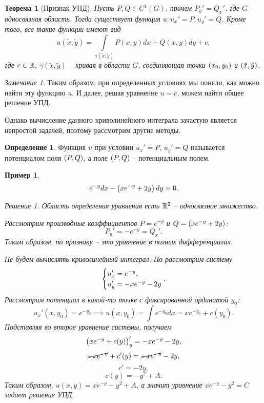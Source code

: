 \documentclass[a5paper, 10pt]{article}
\theoremstyle{definition}
\newtheorem{Def}{Определение}
\theoremstyle{plain}
\newtheorem{Th}{Теорема}
\newtheorem{Ex}{Пример}
\theoremstyle{remark}
\newtheorem*{Note}{Замечание}
\newtheorem*{Solution}{Решение}
\begin{document}
	\begin{Th}[Признак УПД]
		Пусть $P, Q \in C^1(G)$, причем $P_y' = Q_x'$, где $G$ -- односвязная область.
		Тогда существует функция $u : u_x' = P, u_y' = Q$. Кроме того, все такие функции имеют вид 
		\[
		u(\tilde{x}, \tilde{y}) = \int\limits_{\gamma(\tilde{x}, \tilde{y})} P(x,y)dx + Q(x,y)dy + c,
		\]
		где $c \in \mathbb{R}$, $\gamma(\tilde{x}, \tilde{y})$ -- кривая в области $G$, соединяющая точки $\left(x_0,y_0\right)$ и $\left(\tilde{x}, \tilde{y}\right)$.
	\end{Th}
	
	\begin{Note}
		Таким образом, при определенных условиях мы поняли, как можно найти эту функцию $u$. И далее, решая уравнение $u=c$, можем найти общее решение УПД.
		
		Однако вычисление данного криволинейного интеграла зачастую является непростой задачей, поэтому рассмотрим другие методы.
	\end{Note}
	
	 \begin{Def}
		Функция $u$ при условии $u_x'=P$, $u_y'=Q$ называется потенциалом поля $\left(P,Q\right)$, а поле $\left(P,Q\right)$ -- потенциальным полем. 
	\end{Def}
	
	\begin{Ex}
		\[
		e^{-y}dx - \left(xe^{-y}+2y\right) dy = 0.
		\]
		\begin{Solution}
			Область определения уравнения есть $\mathbb{R}^2$ -- односвязное множество. 
			
			Рассмотрим производные коэффициентов $P=e^{-y}$ и $Q = \left(xe^{-y}+2y\right)$:
			\[
				P_y' = -e^{-y} = Q_x'.
			\]
			Таким образом, по признаку -- это уравнение в полных дифференциалах. 
			
			Не будем вычислять криволинейный интеграл. Но рассмотрим систему
			\[
			\case{u'_x = e^{-y}, \\ 
					u_y' = -xe^{-y}-2y}.
			\]
			Рассмотрим потенциал в какой-то точке с фиксированной ординатой $y_0$: 
			\[
			u_x' (x, y_0) = e^{-y_0} \implies u(x, y_0) = \int e^{-y_0} dx = xe^{-y_0} + c(y_0).
			\]
			Подставляя во второе уравнение системы, получаем
			\[
			\left(xe^{-y} + c(y)\right)_y' = -xe^{-y} - 2y,
			\]
			\[
			\cancel{-xe^{-y}} + c'(y) = \cancel{-xe^{-y}} - 2y,
			\]
			\[
			c' = -2y,
			\]
			\[
			c(y) = -y^2 + A.
			\]
			Таким образом, $u(x,y) = xe^{-y} -y^2 + A$, а значит уравнение $ xe^{-y} -y^2 = C$ задает решение УПД.
		\end{Solution}
	\end{Ex}
	
\end{document}
